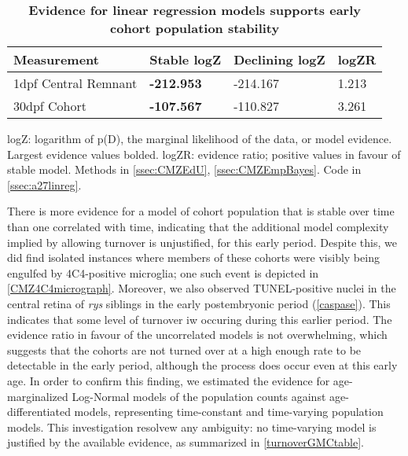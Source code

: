 \begin{table}[!ht]
    \centering
    \caption{{\bf Evidence for linear regression models supports early cohort population stability}}
    \begin{tabular}{|l|l|l|l|}
    \hline
    {\bf Measurement} & {\bf Stable logZ} & {\bf Declining logZ} & {\bf logZR}\\ \hline
    1dpf Central Remnant & {\bf -212.953} & -214.167 & 1.213\\ \hline    
    30dpf Cohort & {\bf -107.567} & -110.827 & 3.261\\ \hline
    \end{tabular}
   
    \begin{flushleft}logZ: logarithm of p(D), the marginal likelihood of the data, or model evidence.  Largest evidence values bolded. logZR: evidence ratio; positive values in favour of stable model.
    Methods in \autoref{ssec:CMZEdU}, \autoref{ssec:CMZEmpBayes}.
    Code in \autoref{ssec:a27linreg}.
    \end{flushleft}
    \label{turnovertable}
\end{table}

There is more evidence for a model of cohort population that is stable over time than one correlated with time, indicating that the additional model complexity implied by allowing turnover is unjustified, for this early period. Despite this, we did find isolated instances where members of these cohorts were visibly being engulfed by 4C4-positive microglia; one such event is depicted in \autoref{CMZ4C4micrograph}. Moreover, we also observed TUNEL-positive nuclei in the central retina of \textit{rys} siblings in the early postembryonic period (\autoref{caspase}). This indicates that some level of turnover iw occuring during this earlier period. The evidence ratio in favour of the uncorrelated models is not overwhelming, which suggests that the cohorts are not turned over at a high enough rate to be detectable in the early period, although the process does occur even at this early age. In order to confirm this finding, we estimated the evidence for age-marginalized Log-Normal models of the population counts against age-differentiated models, representing time-constant and time-varying population models. This investigation resolvew any ambiguity: no time-varying model is justified by the available evidence, as summarized in \autoref{turnoverGMCtable}.


